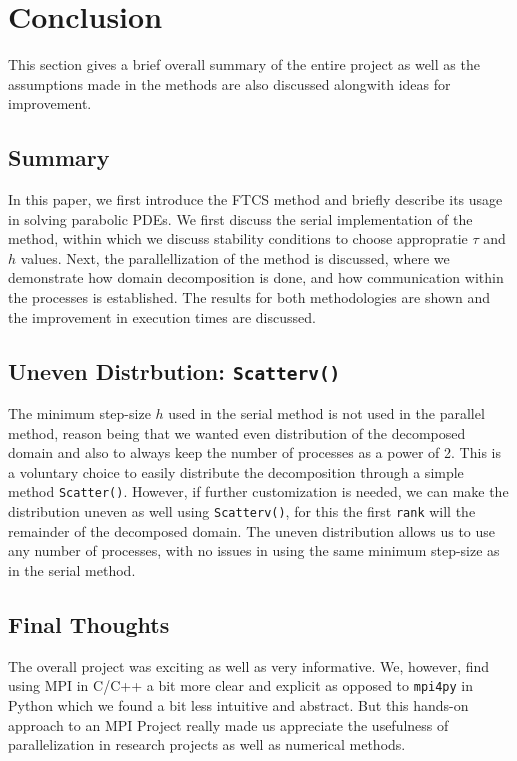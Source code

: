 \section{Conclusion}
This section gives a brief overall summary of the entire project as well as the assumptions made in the methods are also discussed alongwith ideas for improvement.

\subsection{Summary}
In this paper, we first introduce the FTCS method and briefly describe its usage in solving parabolic PDEs. We first discuss the serial implementation of the method, within which we discuss stability conditions to choose appropratie $\tau$ and $h$ values. Next, the parallellization of the method is discussed, where we demonstrate how domain decomposition is done, and how communication within the processes is established. The results for both methodologies are shown and the improvement in execution times are discussed.

\subsection{Uneven Distrbution: \texttt{Scatterv()}}
The minimum step-size $h$ used in the serial method is not used in the parallel method, reason being that we wanted even distribution of the decomposed domain and also to always keep the number of processes as a power of 2. This is a voluntary choice to easily distribute the decomposition through a simple method \texttt{Scatter()}. However, if further customization is needed, we can make the distribution uneven as well using \texttt{Scatterv()}, for this the first \texttt{rank} will the remainder of the decomposed domain. The uneven distribution allows us to use any number of processes, with no issues in using the same minimum step-size as in the serial method.

\subsection{Final Thoughts}
The overall project was exciting as well as very informative. We, however, find using MPI in C/C++ a bit more clear and explicit as opposed to \texttt{mpi4py} in Python which we found a bit less intuitive and abstract. But this hands-on approach to an MPI Project really made us appreciate the usefulness of parallelization in research projects as well as numerical methods.